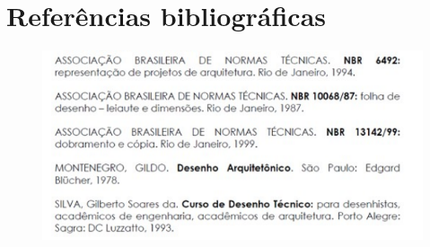 \documentclass{article}
\begin{document}
\section{Referências bibliográficas}

\begin{figure} [H] %
\centering
\includegraphics[scale=1.2]{Fig/Figura_ReferenciasBibliograficas.png} 
\end{figure}
\end{document}

